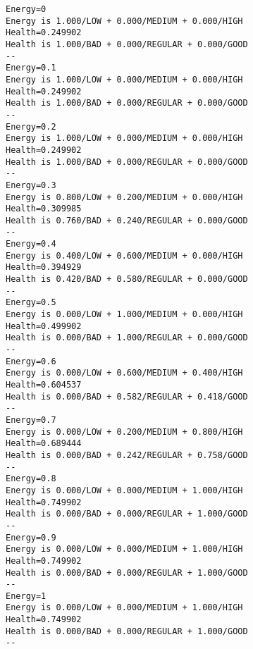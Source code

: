 \documentclass[11pt, final, a4paper]{article}
\begin{document}
	\begin{lstlisting}
Energy=0
Energy is 1.000/LOW + 0.000/MEDIUM + 0.000/HIGH
Health=0.249902
Health is 1.000/BAD + 0.000/REGULAR + 0.000/GOOD
--
Energy=0.1
Energy is 1.000/LOW + 0.000/MEDIUM + 0.000/HIGH
Health=0.249902
Health is 1.000/BAD + 0.000/REGULAR + 0.000/GOOD
--
Energy=0.2
Energy is 1.000/LOW + 0.000/MEDIUM + 0.000/HIGH
Health=0.249902
Health is 1.000/BAD + 0.000/REGULAR + 0.000/GOOD
--
Energy=0.3
Energy is 0.800/LOW + 0.200/MEDIUM + 0.000/HIGH
Health=0.309985
Health is 0.760/BAD + 0.240/REGULAR + 0.000/GOOD
--
Energy=0.4
Energy is 0.400/LOW + 0.600/MEDIUM + 0.000/HIGH
Health=0.394929
Health is 0.420/BAD + 0.580/REGULAR + 0.000/GOOD
--
Energy=0.5
Energy is 0.000/LOW + 1.000/MEDIUM + 0.000/HIGH
Health=0.499902
Health is 0.000/BAD + 1.000/REGULAR + 0.000/GOOD
--
Energy=0.6
Energy is 0.000/LOW + 0.600/MEDIUM + 0.400/HIGH
Health=0.604537
Health is 0.000/BAD + 0.582/REGULAR + 0.418/GOOD
--
Energy=0.7
Energy is 0.000/LOW + 0.200/MEDIUM + 0.800/HIGH
Health=0.689444
Health is 0.000/BAD + 0.242/REGULAR + 0.758/GOOD
--
Energy=0.8
Energy is 0.000/LOW + 0.000/MEDIUM + 1.000/HIGH
Health=0.749902
Health is 0.000/BAD + 0.000/REGULAR + 1.000/GOOD
--
Energy=0.9
Energy is 0.000/LOW + 0.000/MEDIUM + 1.000/HIGH
Health=0.749902
Health is 0.000/BAD + 0.000/REGULAR + 1.000/GOOD
--
Energy=1
Energy is 0.000/LOW + 0.000/MEDIUM + 1.000/HIGH
Health=0.749902
Health is 0.000/BAD + 0.000/REGULAR + 1.000/GOOD
--
	\end{lstlisting}
\end{document}
